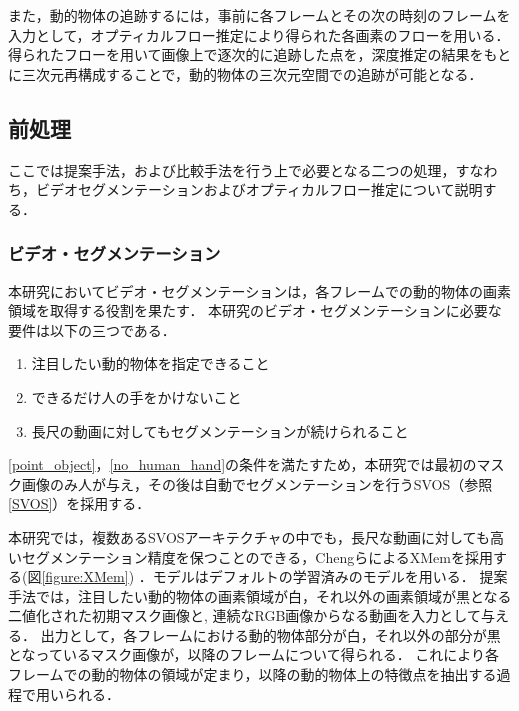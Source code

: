 また，動的物体の追跡するには，事前に各フレームとその次の時刻のフレームを入力として，オプティカルフロー推定により得られた各画素のフローを用いる．
得られたフローを用いて画像上で逐次的に追跡した点を，深度推定の結果をもとに三次元再構成することで，動的物体の三次元空間での追跡が可能となる．

\begin{figure}[htbp]
	\centering
\end{figure}

\subsection{前処理}\label{subsec:preparation}
ここでは提案手法，および比較手法を行う上で必要となる二つの処理，すなわち，ビデオセグメンテーションおよびオプティカルフロー推定について説明する．
\subsubsection{ビデオ・セグメンテーション}\label{subsubsec:prepare_segmentation}
本研究においてビデオ・セグメンテーションは，各フレームでの動的物体の画素領域を取得する役割を果たす．
本研究のビデオ・セグメンテーションに必要な要件は以下の三つである．
\begin{enumerate}
    \item 注目したい動的物体を指定できること
    \label{point_object}
    \item できるだけ人の手をかけないこと
    \label{no_human_hand}
    \item 長尺の動画に対してもセグメンテーションが続けられること
\end{enumerate}

\ref{point_object}，\ref{no_human_hand}の条件を満たすため，本研究では最初のマスク画像のみ人が与え，その後は自動でセグメンテーションを行うSVOS（参照\ref{SVOS}）を採用する．

本研究では，複数あるSVOSアーキテクチャの中でも，長尺な動画に対しても高いセグメンテーション精度を保つことのできる，Chengら\cite{cheng2022xmem}によるXMemを採用する(図\ref{figure:XMem})
．モデルはデフォルトの学習済みのモデルを用いる．
提案手法では，注目したい動的物体の画素領域が白，それ以外の画素領域が黒となる二値化された初期マスク画像と,
連続なRGB画像からなる動画を入力として与える．
出力として，各フレームにおける動的物体部分が白，それ以外の部分が黒となっているマスク画像が，以降のフレームについて得られる．
これにより各フレームでの動的物体の領域が定まり，以降の動的物体上の特徴点を抽出する過程で用いられる．


